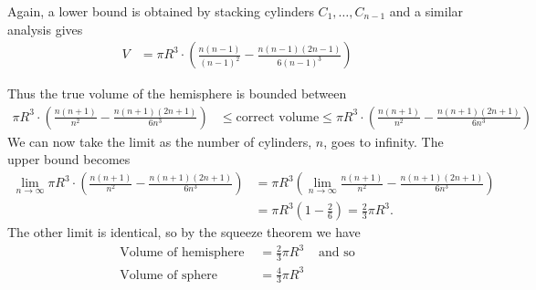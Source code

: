 Again, a lower bound is obtained by stacking cylinders $C_1,\dots,C_{n-1}$ and a similar
analysis gives
\begin{align*}
  V &= \pi R^3 \cdot \left( \frac{n(n-1)}{(n-1)^2}
- \frac{n(n-1)(2n-1)}{6(n-1)^3} \right)
\end{align*}

Thus the true volume of the hemisphere is bounded between
\begin{align*}
  \pi R^3 \cdot \left( \frac{n(n+1)}{n^2}
- \frac{n(n+1)(2n+1)}{6n^3} \right)
  & \leq \text{correct volume}
  \leq \pi R^3 \cdot \left( \frac{n(n+1)}{n^2}
- \frac{n(n+1)(2n+1)}{6n^3} \right)
\end{align*}
We can now take the limit as the number of cylinders, $n$, goes to infinity. The upper
bound becomes
\begin{align*}
  \lim_{n \to \infty} \pi R^3 \cdot \left( \frac{n(n+1)}{n^2}
- \frac{n(n+1)(2n+1)}{6n^3} \right)
  &= \pi R^3 \left( \lim_{n\to\infty} \frac{n(n+1)}{n^2} -
\frac{n(n+1)(2n+1)}{6n^3}
\right)\\
  &= \pi R^3 \left( 1 - \frac{2}{6} \right) = \frac{2}{3} \pi R^3.
\end{align*}
The other limit is identical, so by the squeeze theorem we have
\begin{align*}
  \text{Volume of hemisphere } &= \frac{2}{3} \pi R^3 & \text{ and so}\\
  \text{Volume of sphere } &= \frac{4}{3} \pi R^3
\end{align*}
